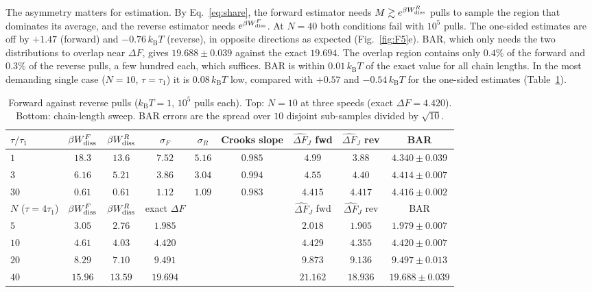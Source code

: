 \documentclass[11pt,a4paper]{article}
\newcommand{\kT}{k_{\mathrm B}T}
\newcommand{\Wd}{W_{\rm diss}}
\newcommand{\dFJ}{\widehat{\Delta F}_J}
\begin{document}
The asymmetry matters for estimation. By Eq.~\eqref{eq:share}, the forward estimator needs
$M\gtrsim e^{\beta\Wd^R}$ pulls to sample the region that dominates its average, and the reverse estimator
needs $e^{\beta\Wd^F}$. At $N=40$ both conditions fail with $10^5$ pulls. The one-sided estimates are off by
$+1.47$ (forward) and $-0.76\,\kT$ (reverse), in opposite directions as expected (Fig.~\ref{fig:F5}e).
BAR, which only needs the two distributions to overlap near $\Delta F$, gives $19.688\pm0.039$ against the exact
$19.694$. The overlap region contains only $0.4\%$ of the forward and $0.3\%$ of the reverse pulls, a few hundred each,
which suffices. BAR is within $0.01\,\kT$ of the exact value for all chain lengths. In the
most demanding single case ($N=10$, $\tau=\tau_1$) it is $0.08\,\kT$ low, compared with $+0.57$ and $-0.54\,\kT$ for
the one-sided estimates (Table~\ref{tab:F5}).

\begin{table}[h]
\centering\small\setlength{\tabcolsep}{4pt}
\begin{tabular}{lcccccccc}
\toprule
$\tau/\tau_1$ & $\beta\Wd^F$ & $\beta\Wd^R$ & $\sigma_F$ & $\sigma_R$ & Crooks slope & $\dFJ$ fwd & $\dFJ$ rev & BAR\\
\midrule
$1$ & $18.3$ & $13.6$ & $7.52$ & $5.16$ & $0.985$ & $4.99$ & $3.88$ & $4.340\pm0.039$\\
$3$ & $6.16$ & $5.21$ & $3.86$ & $3.04$ & $0.994$ & $4.55$ & $4.40$ & $4.414\pm0.007$\\
$30$ & $0.61$ & $0.61$ & $1.12$ & $1.09$ & $0.983$ & $4.415$ & $4.417$ & $4.416\pm0.002$\\
\midrule
$N$ ($\tau=4\tau_1$) & $\beta\Wd^F$ & $\beta\Wd^R$ & exact $\Delta F$ & & & $\dFJ$ fwd & $\dFJ$ rev & BAR\\
\midrule
$5$ & $3.05$ & $2.76$ & $1.985$ & & & $2.018$ & $1.905$ & $1.979\pm0.007$\\
$10$ & $4.61$ & $4.03$ & $4.420$ & & & $4.429$ & $4.355$ & $4.420\pm0.007$\\
$20$ & $8.29$ & $7.10$ & $9.491$ & & & $9.873$ & $9.136$ & $9.497\pm0.013$\\
$40$ & $15.96$ & $13.59$ & $19.694$ & & & $21.162$ & $18.936$ & $19.688\pm0.039$\\
\bottomrule
\end{tabular}
\caption{Forward against reverse pulls ($\kT=1$, $10^5$ pulls each). Top: $N=10$ at three speeds (exact
$\Delta F=4.420$). Bottom: chain-length sweep. BAR errors are the spread over $10$ disjoint sub-samples divided by $\sqrt{10}$.}
\label{tab:F5}
\end{table}
\end{document}
